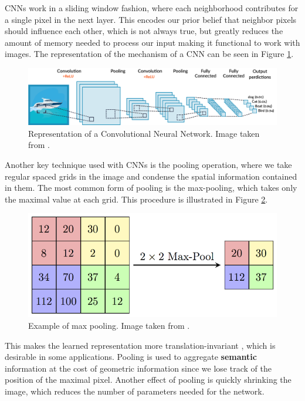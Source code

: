 CNNs work in a sliding window fashion, where each neighborhood contributes for a single pixel in the next layer. This encodes our prior belief that neighbor pixels should influence each other, which is not always true, but greatly reduces the amount of memory needed to process our input making it functional to work with images. The representation of the mechanism of a CNN can be seen in Figure \ref{cnn}.

\begin{figure}[H]
    \includegraphics[width=\textwidth]{Cap2-Methods/image2.png}
    \centering
	\caption{Representation of a Convolutional Neural Network. Image taken from \cite{cnnimg}.}
	\label{cnn}
\end{figure}

Another key technique used with CNNs is the pooling operation, where we take regular spaced grids in the image and condense the spatial information contained in them. The most common form of pooling is the max-pooling, which takes only the maximal value at each grid. This procedure is illustrated in Figure \ref{pooling}.

\begin{figure}[H]
    \includegraphics[width=.7\textwidth]{Cap2-Methods/MaxpoolSample2.png}
    \centering
	\caption{Example of max pooling. Image taken from \cite{poolimg}.}
	\label{pooling}
\end{figure}

This makes the learned representation more translation-invariant \cite{dlbook}, which is desirable in some applications. Pooling is used to aggregate \textbf{semantic} information at the cost of geometric information since we lose track of the position of the maximal pixel. Another effect of pooling is quickly shrinking the image, which reduces the number of parameters needed for the network.

